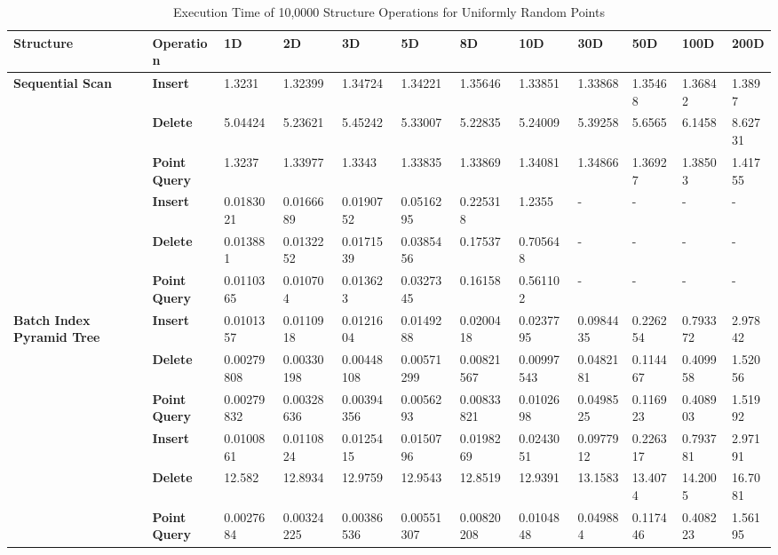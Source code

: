 \begin{landscape}

	\begin{table}
		\centering
		\begin{tabular}{|p{2cm}|l|l|l|l|l|l|l|l|l|l|l|}
			\hline
			\textbf{Structure} & \textbf{Operation} & \textbf{1D} & \textbf{2D} & \textbf{3D} & \textbf{5D} & \textbf{8D} & \textbf{10D} & \textbf{30D} & \textbf{50D} & \textbf{100D} & \textbf{200D} \\
			\hline
			\multirow{ 4}{*}{\textbf{Sequential Scan}} & \textbf{Insert} & 1.3231 & 1.32399 & 1.34724 & 1.34221 & 1.35646 & 1.33851 & 1.33868 & 1.35468 & 1.36842 & 1.3897 \\
			 & \textbf{Delete} & 5.04424 & 5.23621 & 5.45242 & 5.33007 & 5.22835 & 5.24009 & 5.39258 & 5.6565 & 6.1458 & 8.62731 \\
			 & \textbf{Point Query} & 1.3237 & 1.33977 & 1.3343 & 1.33835 & 1.33869 & 1.34081 & 1.34866 & 1.36927 & 1.38503 & 1.41755 \\
			\hline
			\multirow{ 4}{*}{\textbf{Octree}} & \textbf{Insert} & 0.0183021 & 0.0166689 & 0.0190752 & 0.0516295 & 0.225318 & 1.2355 & - & - & - & - \\
			 & \textbf{Delete} & 0.013881 & 0.0132252 & 0.0171539 & 0.0385456 & 0.17537 & 0.705648 & - & - & - & - \\
			 & \textbf{Point Query} & 0.0110365 & 0.010704 & 0.013623 & 0.0327345 & 0.16158 & 0.561102 & - & - & - & - \\
			\hline
			\multirow{ 4}{*}{\textbf{Batch Index Pyramid Tree}} & \textbf{Insert} & 0.0101357 & 0.0110918 & 0.0121604 & 0.0149288 & 0.0200418 & 0.0237795 & 0.0984435 & 0.226254 & 0.793372 & 2.97842 \\
			 & \textbf{Delete} & 0.00279808 & 0.00330198 & 0.00448108 & 0.00571299 & 0.00821567 & 0.00997543 & 0.0482181 & 0.114467 & 0.409958 & 1.52056 \\
			 & \textbf{Point Query} & 0.00279832 & 0.00328636 & 0.00394356 & 0.0056293 & 0.00833821 & 0.0102698 & 0.0498525 & 0.116923 & 0.408903 & 1.51992 \\
			\hline
			\multirow{ 4}{*}{\textbf{Defragmented Index Pyramid Tree}} & \textbf{Insert} & 0.0100861 & 0.0110824 & 0.0125415 & 0.0150796 & 0.0198269 & 0.0243051 & 0.0977912 & 0.226317 & 0.793781 & 2.97191 \\
			 & \textbf{Delete} & 12.582 & 12.8934 & 12.9759 & 12.9543 & 12.8519 & 12.9391 & 13.1583 & 13.4074 & 14.2005 & 16.7081 \\
			 & \textbf{Point Query} & 0.0027684 & 0.00324225 & 0.00386536 & 0.00551307 & 0.00820208 & 0.0104848 & 0.049884 & 0.117446 & 0.408223 & 1.56195 \\
			\hline
		\end{tabular}
		\caption{Execution Time of 10,0000 Structure Operations for Uniformly Random Points}
		\label{tab:perf1-randuniform}
	\end{table}


\end{landscape}
